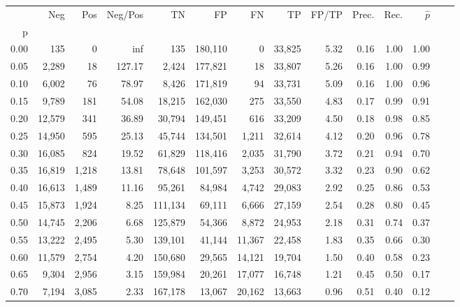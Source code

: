 \begin{tabular}{rrrrrrrrrrrrrr}
\toprule
{} &     Neg &    Pos & Neg/Pos &       TN &       FP &      FN &      TP & FP/TP & Prec. &  Rec. & $\hat{p}$ \\
p    &         &        &         &          &          &         &         &       &       &       &           \\
\midrule
0.00 &     135 &      0 &     inf &      135 &  180,110 &       0 &  33,825 &  5.32 &  0.16 &  1.00 &      1.00 \\
0.05 &   2,289 &     18 &  127.17 &    2,424 &  177,821 &      18 &  33,807 &  5.26 &  0.16 &  1.00 &      0.99 \\
0.10 &   6,002 &     76 &   78.97 &    8,426 &  171,819 &      94 &  33,731 &  5.09 &  0.16 &  1.00 &      0.96 \\
0.15 &   9,789 &    181 &   54.08 &   18,215 &  162,030 &     275 &  33,550 &  4.83 &  0.17 &  0.99 &      0.91 \\
0.20 &  12,579 &    341 &   36.89 &   30,794 &  149,451 &     616 &  33,209 &  4.50 &  0.18 &  0.98 &      0.85 \\
0.25 &  14,950 &    595 &   25.13 &   45,744 &  134,501 &   1,211 &  32,614 &  4.12 &  0.20 &  0.96 &      0.78 \\
0.30 &  16,085 &    824 &   19.52 &   61,829 &  118,416 &   2,035 &  31,790 &  3.72 &  0.21 &  0.94 &      0.70 \\
0.35 &  16,819 &  1,218 &   13.81 &   78,648 &  101,597 &   3,253 &  30,572 &  3.32 &  0.23 &  0.90 &      0.62 \\
0.40 &  16,613 &  1,489 &   11.16 &   95,261 &   84,984 &   4,742 &  29,083 &  2.92 &  0.25 &  0.86 &      0.53 \\
0.45 &  15,873 &  1,924 &    8.25 &  111,134 &   69,111 &   6,666 &  27,159 &  2.54 &  0.28 &  0.80 &      0.45 \\
0.50 &  14,745 &  2,206 &    6.68 &  125,879 &   54,366 &   8,872 &  24,953 &  2.18 &  0.31 &  0.74 &      0.37 \\
0.55 &  13,222 &  2,495 &    5.30 &  139,101 &   41,144 &  11,367 &  22,458 &  1.83 &  0.35 &  0.66 &      0.30 \\
0.60 &  11,579 &  2,754 &    4.20 &  150,680 &   29,565 &  14,121 &  19,704 &  1.50 &  0.40 &  0.58 &      0.23 \\
0.65 &   9,304 &  2,956 &    3.15 &  159,984 &   20,261 &  17,077 &  16,748 &  1.21 &  0.45 &  0.50 &      0.17 \\
0.70 &   7,194 &  3,085 &    2.33 &  167,178 &   13,067 &  20,162 &  13,663 &  0.96 &  0.51 &  0.40 &      0.12 \\

\end{tabular}
